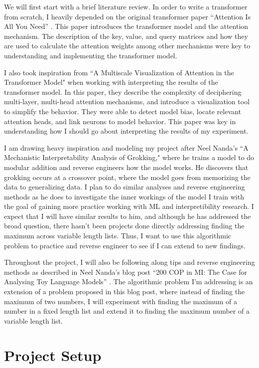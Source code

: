 \documentclass{article}
\begin{document}
We will first start with a brief literature review. In order to write a transformer from scratch, I heavily depended on the original transformer paper ``Attention Is All You Need'' \cite{6}. This paper introduces the transformer model and the attention mechanism. The description of the key, value, and query matrices and how they are used to calculate the attention weights among other mechanisms were key to understanding and implementing the transformer model.

I also took inspiration from ``A Multiscale Visualization of Attention in the Transformer Model" \cite{7} when working with interpreting the results of the transformer model. In this paper, they describe the complexity of deciphering multi-layer, multi-head attention mechanisms, and introduce a visualization tool to simplify the behavior. They were able to detect model bias, locate relevant attention heads, and link neurons to model behavior. This paper was key in understanding how I should go about interpreting the results of my experiment.

I am drawing heavy inspiration and modeling my project after Neel Nanda's ``A Mechanistic Interpretability Analysis of Grokking,"\cite{2} where he trains a model to do modular addition and reverse engineers how the model works. He discovers that grokking occurs at a crossover point, where the model goes from memorizing the data to generalizing data. I plan to do similar analyses and reverse engineering methods as he does to investigate the inner workings of the model I train with the goal of gaining more practice working with ML and interpretibility research. I expect that I will have similar results to him, and although he has addressed the broad question, there hasn't been projects done directly addressing finding the maximum across variable length lists. Thus, I want to use this algorithmic problem to practice and reverse engineer to see if I can extend to new findings.

Throughout the project, I will also be following along tips and reverse engineering methods as described in Neel Nanda's blog post ``200 COP in MI: The Case for Analysing Toy Language Models'' \cite{3}. The algorithmic problem I'm addressing is an extension of a problem proposed in this blog post, where instead of finding the maximum of two numbers, I will experiment with finding the maximum of a number in a fixed length list and extend it to finding the maximum number of a variable length list. 

\section{Project Setup}
\end{document}
